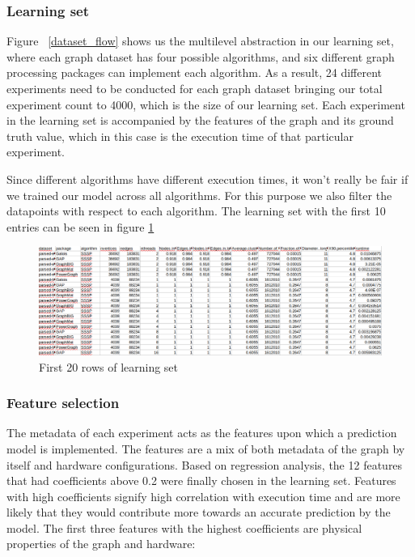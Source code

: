 \subsubsection{Learning set}
Figure ~\ref{dataset_flow}  shows us the multilevel abstraction in our learning set, where each graph dataset has four possible algorithms, and six different graph processing packages can implement each algorithm. As a result, 24 different experiments need to be conducted for each graph dataset bringing our total experiment count to 4000, which is the size of our learning set. Each experiment in the learning set is accompanied by the features of the graph and its ground truth value, which in this case is the execution time of that particular experiment.  

Since different algorithms have different execution times, it won't really be fair if we trained our model across all algorithms. For this purpose we also filter the datapoints with respect to each algorithm. The learning set with the first 10 entries can be seen in figure \ref{learning set} 

\begin{figure}
    \centering
    \includegraphics[width=1\columnwidth]{figures/learning_set.png}
    \caption{First 20 rows of learning set}
    \label{learning set}
\end{figure}
\subsubsection{Feature selection}
The metadata of each experiment acts as the features upon which a prediction model is implemented. The features are a mix of both metadata of the graph by itself and hardware configurations. Based on regression analysis, the 12  features that had coefficients above 0.2 were finally chosen in the learning set. Features with high coefficients signify high correlation with execution time and are more likely that they would contribute more towards an accurate prediction by the model. The first three features with the highest coefficients are physical properties of the graph and hardware:

